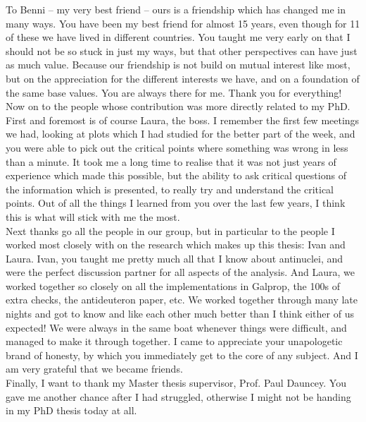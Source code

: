 To Benni -- my very best friend -- ours is a friendship which has changed me in many ways. You have been my best friend for almost 15 years, even though for 11 of these we have lived in different countries. You taught me very early on that I should not be so stuck in just my ways, but that other perspectives can have just as much value. Because our friendship is not build on mutual interest like most, but on the appreciation for the different interests we have, and on a foundation of the same base values. You are always there for me. Thank you for everything!\\

Now on to the people whose contribution was more directly related to my PhD. First and foremost is of course Laura, the boss. I remember the first few meetings we had, looking at plots which I had studied for the better part of the week, and you were able to pick out the critical points where something was wrong in less than a minute. It took me a long time to realise that it was not just years of experience which made this possible, but the ability to ask critical questions of the information which is presented, to really try and understand the critical points. Out of all the things I learned from you over the last few years, I think this is what will stick with me the most. \\

Next thanks go all the people in our group, but in particular to the people I worked most closely with on the research which makes up this thesis: Ivan and Laura. Ivan, you taught me pretty much all that I know about antinuclei, and were the perfect discussion partner for all aspects of the analysis. And Laura, we worked together so closely on all the implementations in Galprop, the 100s of extra checks, the antideuteron paper, etc. We worked together through many late nights and got to know and like each other much better than I think either of us expected! We were always in the same boat whenever things were difficult, and managed to make it through together. I came to appreciate your unapologetic brand of honesty, by which you immediately get to the core of any subject. And I am very grateful that we became friends. \\

Finally, I want to thank my Master thesis supervisor, Prof. Paul Dauncey. You gave me another chance after I had struggled, otherwise I might not be handing in my PhD thesis today at all. 


\newpage
